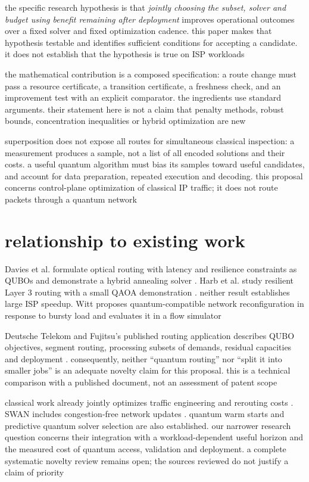 \documentclass[11pt,a4paper]{article}
\newcommand{\1}{\mathbf{1}}
\begin{document}
the specific research hypothesis is that \emph{jointly choosing the subset, solver and budget using benefit remaining after deployment} improves operational outcomes over a fixed solver and fixed optimization cadence. this paper makes that hypothesis testable and identifies sufficient conditions for accepting a candidate. it does not establish that the hypothesis is true on ISP workloads

the mathematical contribution is a composed specification: a route change must pass a resource certificate, a transition certificate, a freshness check, and an improvement test with an explicit comparator. the ingredients use standard arguments. their statement here is not a claim that penalty methods, robust bounds, concentration inequalities or hybrid optimization are new

superposition does not expose all routes for simultaneous classical inspection: a measurement produces a sample, not a list of all encoded solutions and their costs. a useful quantum algorithm must bias its samples toward useful candidates, and account for data preparation, repeated execution and decoding. this proposal concerns control-plane optimization of classical IP traffic; it does not route packets through a quantum network

\section{relationship to existing work}
Davies et al. formulate optical routing with latency and resilience constraints as QUBOs and demonstrate a hybrid annealing solver \cite{davies}. Harb et al. study resilient Layer 3 routing with a small QAOA demonstration \cite{harb}. neither result establishes large ISP speedup. Witt proposes quantum-compatible network reconfiguration in response to bursty load and evaluates it in a flow simulator \cite{witt}

Deutsche Telekom and Fujitsu's published routing application describes QUBO objectives, segment routing, processing subsets of demands, residual capacities and deployment \cite{patent}. consequently, neither ``quantum routing'' nor ``split it into smaller jobs'' is an adequate novelty claim for this proposal. this is a technical comparison with a published document, not an assessment of patent scope

classical work already jointly optimizes traffic engineering and rerouting costs \cite{zheng}. SWAN includes congestion-free network updates \cite{swan}. quantum warm starts \cite{egger} and predictive quantum solver selection \cite{volpe} are also established. our narrower research question concerns their integration with a workload-dependent useful horizon and the measured cost of quantum access, validation and deployment. a complete systematic novelty review remains open; the sources reviewed do not justify a claim of priority
\end{document}
